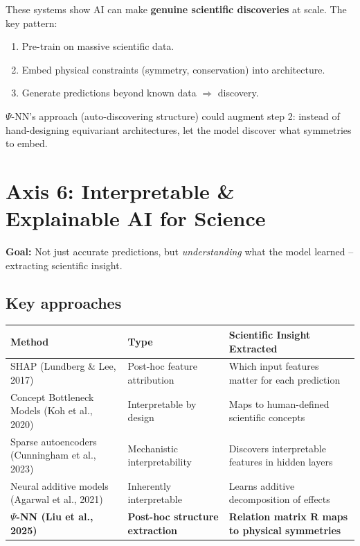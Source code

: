 \documentclass[11pt,a4paper]{article}
\begin{document}
These systems show AI can make \textbf{genuine scientific discoveries} at scale. The key pattern:
\begin{enumerate}[leftmargin=1.8em,itemsep=2pt]
\item Pre-train on massive scientific data.
\item Embed physical constraints (symmetry, conservation) into architecture.
\item Generate predictions beyond known data $\Rightarrow$ discovery.
\end{enumerate}

$\Psi$-NN's approach (auto-discovering structure) could augment step 2: instead of hand-designing equivariant architectures, let the model discover what symmetries to embed.

\section{Axis 6: Interpretable \& Explainable AI for Science}

\textbf{Goal:} Not just accurate predictions, but \emph{understanding} what the model learned -- extracting scientific insight.

\subsection{Key approaches}

\begin{center}
\renewcommand{\arraystretch}{1.3}
\begin{tabular}{@{}p{3.5cm} p{3cm} p{6cm}@{}}
\toprule
\textbf{Method} & \textbf{Type} & \textbf{Scientific Insight Extracted} \\
\midrule
SHAP (Lundberg \& Lee, 2017) & Post-hoc feature attribution & Which input features matter for each prediction \\
\addlinespace
Concept Bottleneck Models (Koh et al., 2020) & Interpretable by design & Maps to human-defined scientific concepts \\
\addlinespace
Sparse autoencoders (Cunningham et al., 2023) & Mechanistic interpretability & Discovers interpretable features in hidden layers \\
\addlinespace
Neural additive models (Agarwal et al., 2021) & Inherently interpretable & Learns additive decomposition of effects \\
\addlinespace
\textbf{$\Psi$-NN (Liu et al., 2025)} & \textbf{Post-hoc structure extraction} & \textbf{Relation matrix $\mathbf{R}$ maps to physical symmetries} \\
\bottomrule
\end{tabular}
\end{center}
\end{document}
